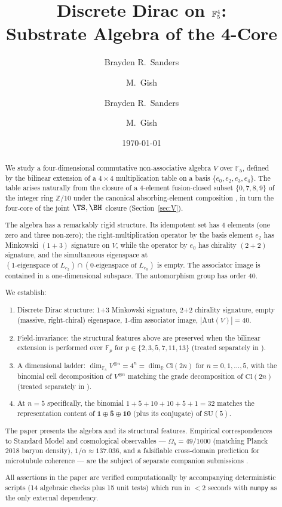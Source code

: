\documentclass[11pt,reqno]{amsart}
\title[Discrete Dirac on $\F_5^4$]
{Discrete Dirac on $\F_5^4$: \\
 Substrate Algebra of the 4-Core}
\author{Brayden R.\ Sanders \and M.\ Gish}
\author{Brayden R.\ Sanders \and M.\ Gish}
\date{\today}
\theoremstyle{plain}
\theoremstyle{definition}
\theoremstyle{remark}
\newcommand{\Z}{\mathbb{Z}}
\newcommand{\F}{\mathbb{F}}
\newcommand{\R}{\mathbb{R}}
\newcommand{\Cl}{\mathrm{Cl}}
\newcommand{\Aut}{\mathrm{Aut}}
\begin{document}
\begin{abstract}
We study a four-dimensional commutative non-associative algebra $V$ over
$\F_5$, defined by the bilinear extension of a $4 \times 4$ multiplication
table on a basis $\{e_0, e_2, e_3, e_4\}$. The table arises naturally from
the closure of a 4-element fusion-closed subset $\{0,7,8,9\}$ of the integer
ring $\Z/10$ under the canonical absorbing-element composition
\cite{SandersGishFourCore}, in turn the four-core of the joint
$\TS, \BH$ closure (Section~\ref{sec:V}).

The algebra has a remarkably rigid structure. Its idempotent set has 4
elements (one zero and three non-zero); the right-multiplication operator
by the basis element $e_2$ has Minkowski $(1{+}3)$ signature on $V$, while
the operator by $e_0$ has chirality $(2{+}2)$ signature, and the
simultaneous eigenspace at $(\text{1-eigenspace of } L_{e_2}) \cap
(\text{0-eigenspace of } L_{e_0})$ is empty. The associator image is
contained in a one-dimensional subspace. The automorphism group has
order 40.

We establish:
\begin{enumerate}[label={(\arabic*)}]
\item Discrete Dirac structure: 1+3 Minkowski signature, 2+2 chirality
signature, empty (massive, right-chiral) eigenspace, 1-dim associator
image, $|\Aut(V)| = 40$.
\item Field-invariance: the structural features above are preserved when
the bilinear extension is performed over $\F_p$ for
$p \in \{2,3,5,7,11,13\}$ (treated separately in
\cite{SandersGishFpUniversality}).
\item A dimensional ladder: $\dim_{\F_5} V^{\otimes n} = 4^n =
\dim_\R \Cl(2n)$ for $n=0,1,\ldots,5$, with the binomial cell
decomposition of $V^{\otimes n}$ matching the grade decomposition of
$\Cl(2n)$ (treated separately in \cite{SandersGishCliffordLadder}).
\item At $n=5$ specifically, the binomial $1+5+10+10+5+1 = 32$ matches the
representation content of $\mathbf{1} \oplus \bar{\mathbf{5}} \oplus \mathbf{10}$
(plus its conjugate) of $\mathrm{SU}(5)$.
\end{enumerate}

The paper presents the algebra and its structural features. Empirical
correspondences to Standard Model and cosmological observables ---
$\Omega_b = 49/1000$ (matching Planck 2018 baryon density),
$1/\alpha \approx 137.036$, and a falsifiable cross-domain prediction
for microtubule coherence --- are the subject of separate companion
submissions \cite{SandersJohnsonDarkSector,SandersJohnsonMassHierarchy}.

All assertions in the paper are verified computationally by accompanying
deterministic scripts (14 algebraic checks plus 15 unit tests) which
run in $<2$ seconds with \texttt{numpy} as the only external dependency.
\end{abstract}
\end{document}
